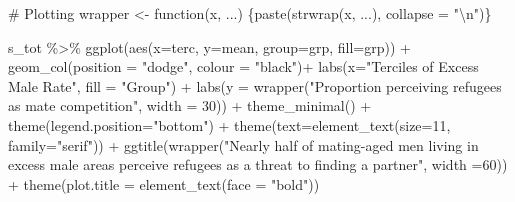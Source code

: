 \documentclass[
]{article}
\newenvironment{Shaded}{\begin{snugshade}}{\end{snugshade}}
\newcommand{\AttributeTok}[1]{\textcolor[rgb]{0.40,0.45,0.13}{#1}}
\newcommand{\CommentTok}[1]{\textcolor[rgb]{0.37,0.37,0.37}{#1}}
\newcommand{\ControlFlowTok}[1]{\textcolor[rgb]{0.00,0.23,0.31}{#1}}
\newcommand{\DecValTok}[1]{\textcolor[rgb]{0.68,0.00,0.00}{#1}}
\newcommand{\FunctionTok}[1]{\textcolor[rgb]{0.28,0.35,0.67}{#1}}
\newcommand{\NormalTok}[1]{\textcolor[rgb]{0.00,0.23,0.31}{#1}}
\newcommand{\OtherTok}[1]{\textcolor[rgb]{0.00,0.23,0.31}{#1}}
\newcommand{\SpecialCharTok}[1]{\textcolor[rgb]{0.37,0.37,0.37}{#1}}
\newcommand{\StringTok}[1]{\textcolor[rgb]{0.13,0.47,0.30}{#1}}
\begin{document}
\begin{Shaded}
\begin{Highlighting}[]
\CommentTok{\# Plotting}
\NormalTok{wrapper }\OtherTok{\textless{}{-}} \ControlFlowTok{function}\NormalTok{(x, ...) }
\NormalTok{\{}\FunctionTok{paste}\NormalTok{(}\FunctionTok{strwrap}\NormalTok{(x, ...), }\AttributeTok{collapse =} \StringTok{"}\SpecialCharTok{\textbackslash{}n}\StringTok{"}\NormalTok{)\}}

\NormalTok{s\_tot }\SpecialCharTok{\%\textgreater{}\%} 
  \FunctionTok{ggplot}\NormalTok{(}\FunctionTok{aes}\NormalTok{(}\AttributeTok{x=}\NormalTok{terc, }\AttributeTok{y=}\NormalTok{mean, }\AttributeTok{group=}\NormalTok{grp, }\AttributeTok{fill=}\NormalTok{grp)) }\SpecialCharTok{+}
  \FunctionTok{geom\_col}\NormalTok{(}\AttributeTok{position =} \StringTok{"dodge"}\NormalTok{, }\AttributeTok{colour =} \StringTok{"black"}\NormalTok{)}\SpecialCharTok{+}
  \FunctionTok{labs}\NormalTok{(}\AttributeTok{x=}\StringTok{"Terciles of Excess Male Rate"}\NormalTok{, }\AttributeTok{fill =} \StringTok{"Group"}\NormalTok{) }\SpecialCharTok{+}
  \FunctionTok{labs}\NormalTok{(}\AttributeTok{y =} \FunctionTok{wrapper}\NormalTok{(}\StringTok{"Proportion perceiving refugees as mate competition"}\NormalTok{, }\AttributeTok{width =} \DecValTok{30}\NormalTok{)) }\SpecialCharTok{+}
  \FunctionTok{theme\_minimal}\NormalTok{() }\SpecialCharTok{+}
  \FunctionTok{theme}\NormalTok{(}\AttributeTok{legend.position=}\StringTok{"bottom"}\NormalTok{) }\SpecialCharTok{+}
  \FunctionTok{theme}\NormalTok{(}\AttributeTok{text=}\FunctionTok{element\_text}\NormalTok{(}\AttributeTok{size=}\DecValTok{11}\NormalTok{, }\AttributeTok{family=}\StringTok{"serif"}\NormalTok{)) }\SpecialCharTok{+}
  \FunctionTok{ggtitle}\NormalTok{(}\FunctionTok{wrapper}\NormalTok{(}\StringTok{"Nearly half of mating{-}aged men living in excess male areas perceive refugees as a threat to finding a partner"}\NormalTok{, }\AttributeTok{width =}\DecValTok{60}\NormalTok{)) }\SpecialCharTok{+}
  \FunctionTok{theme}\NormalTok{(}\AttributeTok{plot.title =} \FunctionTok{element\_text}\NormalTok{(}\AttributeTok{face =} \StringTok{"bold"}\NormalTok{))}
\end{Highlighting}
\end{Shaded}
\end{document}
